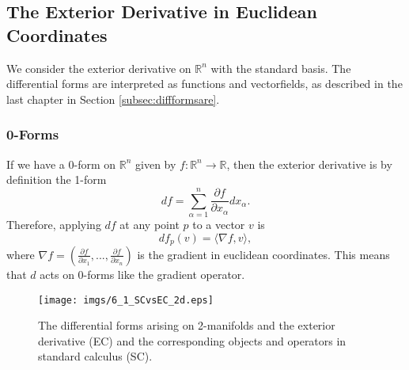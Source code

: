 \subsection{The Exterior Derivative in Euclidean Coordinates}
\label{subsec:EDeuclidean}
We consider the exterior derivative on $\mathbb R^n$ with the standard basis. The differential forms are interpreted as functions and vectorfields, as described in the last chapter in Section \ref{subsec:diffformsare}.

\subsubsection{0-Forms}
If we have a $0$-form on $\mathbb R^n$  given by $f:\mathbb R^n \to \mathbb R$, then the exterior derivative is by definition the 1-form
\[df = \sum_{\alpha = 1}^n \frac{\partial f}{\partial x_\alpha} dx_\alpha .\]
Therefore, applying $df$ at any point $p$ to a vector $v$ is
\[df_p(v) = \langle \nabla f, v \rangle,\]
where $\nabla f = (\frac{\partial f}{\partial x_1},...,\frac{\partial f}{\partial x_n})$ is the gradient in euclidean coordinates. This means that $d$ acts on $0$-forms like the gradient operator.


\begin{figure}
\begin{center}
\texttt{[image: imgs/6\_1\_SCvsEC\_2d.eps]}
\caption{The differential forms arising on 2-manifolds and the exterior derivative (EC) and the corresponding objects and operators in standard calculus (SC).}
\label{fig::6_1_SC2d}
\end{center}

\end{figure}

